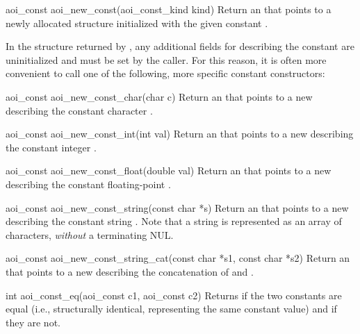 \begin{cprototypelist}
  \item[aoi_const aoi_new_const(aoi_const_kind kind)]
  Return an  that points to a newly allocated
   structure initialized with the given \AOI{} constant
  .

  In the structure returned by , any additional fields
  for describing the constant are uninitialized and must be set by the caller.
  For this reason, it is often more convenient to call one of the following,
  more specific constant constructors:
  \begin{cprototypelist}
    \item[aoi_const aoi_new_const_char(char c)]
    Return an  that points to a new 
    describing the constant character .

    \item[aoi_const aoi_new_const_int(int val)]
    Return an  that points to a new 
    describing the constant integer .

    \item[aoi_const aoi_new_const_float(double val)]
    Return an  that points to a new 
    describing the constant floating-point .

    \item[aoi_const aoi_new_const_string(const char *s)]
    Return an  that points to a new 
    describing the constant string .  Note that a string is
    represented as an array of characters, \emph{without} a terminating NUL\@.

    \item[aoi_const aoi_new_const_string_cat(const char *s1, const char *s2)]
    Return an  that points to a new 
    describing the concatenation of  and .
  \end{cprototypelist}

  \item[int aoi_const_eq(aoi_const c1, aoi_const c2)]
  Returns  if the two constants are equal (i.e., structurally
  identical, representing the same constant value) and  if they are
  not.



\end{cprototypelist}
